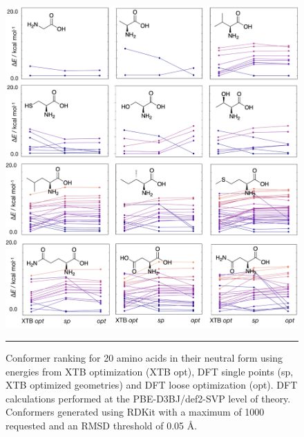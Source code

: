 \documentclass[../../main.tex]{subfiles}
\begin{document}
\begin{figure}[h!]
	\vspace{0.4cm}
	\centering
	\includegraphics[width=\textwidth]{5/autode/figs/figS6a}
	\vspace{0.4cm}
	\hrule
	\caption{Conformer ranking for 20 amino acids in their neutral form using energies from XTB optimization (XTB opt), DFT single points (sp, XTB optimized geometries) and DFT loose optimization (opt). DFT calculations performed at the PBE-D3BJ/def2-SVP level of theory. Conformers generated using RDKit with a maximum of 1000 requested and an RMSD threshold of 0.05 \AA.}
	\label{fig::ade_si_6a}
\end{figure}
\end{document}
